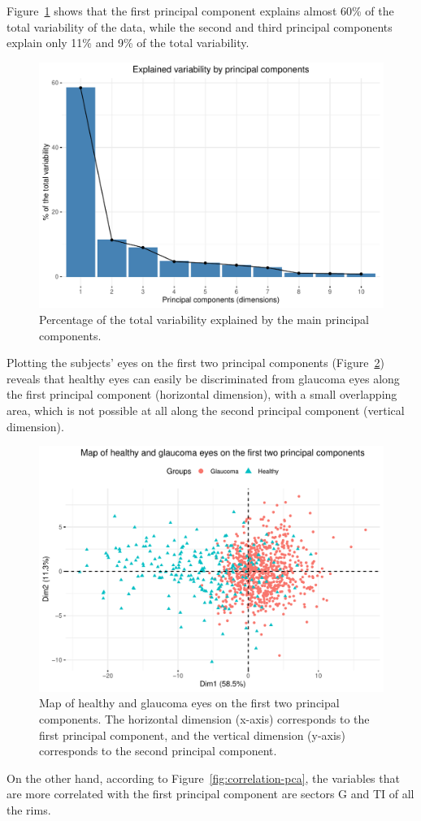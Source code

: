 \documentclass[fleqn,10pt]{wlscirep}
\begin{document}
Figure~\ref{fig:variability-explained-pca} shows that the first principal component explains almost 60\% of the total variability of the data, while the second and third principal components explain only 11\% and 9\% of the total variability.

\begin{figure}[ht]
\centering
\includegraphics[width=0.5\linewidth]{img/explained-variability-principal-components.pdf}
\caption{Percentage of the total variability explained by the main principal components.}
\label{fig:variability-explained-pca}
\end{figure}

Plotting the subjects’ eyes on the first two principal components (Figure~\ref{fig:pca-map}) reveals that healthy eyes can easily be discriminated from glaucoma eyes along the first principal component (horizontal dimension), with a small overlapping area, which is not possible at all along the second principal component (vertical dimension).

\begin{figure}[ht]
\centering
\includegraphics[width=0.5\linewidth]{img/pca-map.pdf}
\caption{Map of healthy and glaucoma eyes on the first two principal components. The horizontal dimension (x-axis) corresponds to the first principal component, and the vertical dimension (y-axis) corresponds to the second principal component.}
\label{fig:pca-map}
\end{figure}

On the other hand, according to Figure~\ref{fig:correlation-pca}, the variables that are more correlated with the first principal component are sectors G and TI of all the rims.
\end{document}
